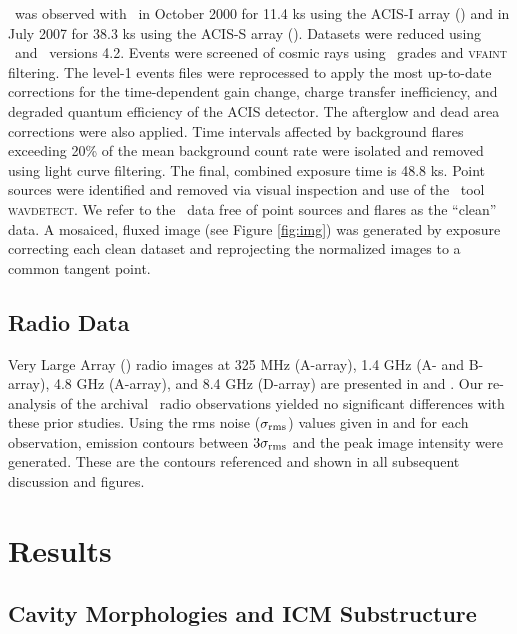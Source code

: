 \documentclass[iop]{emulateapj-rtx4}
\begin{document}
\rbs\ was observed with \cxo\ in October 2000 for 11.4 ks using the
ACIS-I array () and in
July 2007 for 38.3 ks using the ACIS-S array (). Datasets were reduced using
\ciao\ and \caldb\ versions 4.2. Events were screened of cosmic rays
using \asca\ grades and {\textsc{vfaint}} filtering. The level-1
events files were reprocessed to apply the most up-to-date corrections
for the time-dependent gain change, charge transfer inefficiency, and
degraded quantum efficiency of the ACIS detector. The afterglow and
dead area corrections were also applied. Time intervals affected by
background flares exceeding 20\% of the mean background count rate
were isolated and removed using light curve filtering. The final,
combined exposure time is 48.8 ks. Point sources were identified and
removed via visual inspection and use of the \ciao\ tool
{\textsc{wavdetect}}. We refer to the \cxo\ data free of point sources
and flares as the ``clean'' data. A mosaiced, fluxed image (see Figure
\ref{fig:img}) was generated by exposure correcting each clean dataset
and reprojecting the normalized images to a common tangent point.

\subsection{Radio Data}
\label{sec:radio}

Very Large Array (\vla) radio images at 325 MHz (A-array), 1.4 GHz (A-
and B-array), 4.8 GHz (A-array), and 8.4 GHz (D-array) are presented
in \citet{gitti06} and \citet{birzan08}. Our re-analysis of the
archival \vla\ radio observations yielded no significant differences
with these prior studies. Using the rms noise ($\sigma_{\rm{rms}}$)
values given in \citet{gitti06} and \citet{birzan08} for each
observation, emission contours between $3\sigma_{\rm{rms}}$ and the
peak image intensity were generated. These are the contours referenced
and shown in all subsequent discussion and figures.

\section{Results}
\label{sec:results}

\subsection{Cavity Morphologies and ICM Substructure}
\label{sec:morph}
\end{document}
